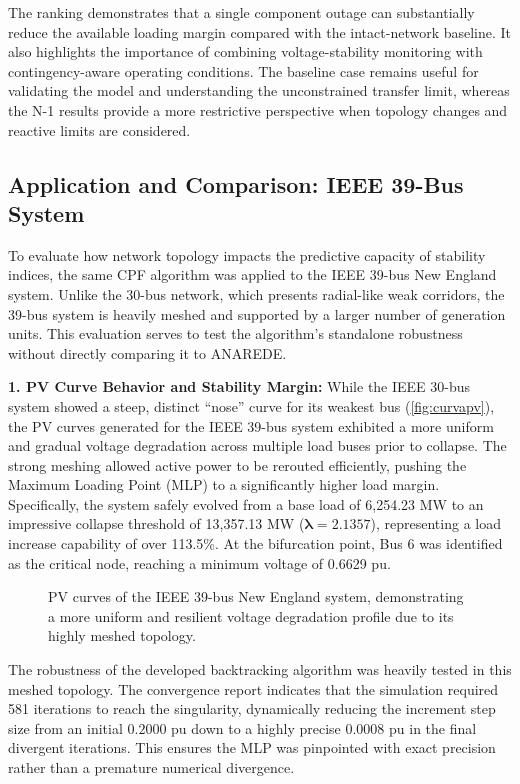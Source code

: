 \documentclass[conference]{IEEEtran}
\begin{document}
The ranking demonstrates that a single component outage can substantially reduce the available loading margin compared with the intact-network baseline. It also highlights the importance of combining voltage-stability monitoring with contingency-aware operating conditions. The baseline case remains useful for validating the model and understanding the unconstrained transfer limit, whereas the N-1 results provide a more restrictive perspective when topology changes and reactive limits are considered.

\subsection{Application and Comparison: IEEE 39-Bus System}
To evaluate how network topology impacts the predictive capacity of stability indices, the same CPF algorithm was applied to the IEEE 39-bus New England system. Unlike the 30-bus network, which presents radial-like weak corridors, the 39-bus system is heavily meshed and supported by a larger number of generation units. This evaluation serves to test the algorithm's standalone robustness without directly comparing it to ANAREDE.

\textbf{1. PV Curve Behavior and Stability Margin:}
While the IEEE 30-bus system showed a steep, distinct ``nose'' curve for its weakest bus (\autoref{fig:curvapv}), the PV curves generated for the IEEE 39-bus system exhibited a more uniform and gradual voltage degradation across multiple load buses prior to collapse. The strong meshing allowed active power to be rerouted efficiently, pushing the Maximum Loading Point (MLP) to a significantly higher load margin. Specifically, the system safely evolved from a base load of 6,254.23 MW to an impressive collapse threshold of 13,357.13 MW ($\bm{\lambda} = 2.1357$), representing a load increase capability of over 113.5\%. At the bifurcation point, Bus 6 was identified as the critical node, reaching a minimum voltage of 0.6629 pu.

\begin{figure}[htbp]
    \centering
    
    \caption{PV curves of the IEEE 39-bus New England system, demonstrating a more uniform and resilient voltage degradation profile due to its highly meshed topology.}
    \label{fig:curvapv_39}
\end{figure}

The robustness of the developed backtracking algorithm was heavily tested in this meshed topology. The convergence report indicates that the simulation required 581 iterations to reach the singularity, dynamically reducing the increment step size from an initial $0.2000$ pu down to a highly precise $0.0008$ pu in the final divergent iterations. This ensures the MLP was pinpointed with exact precision rather than a premature numerical divergence.
\end{document}
